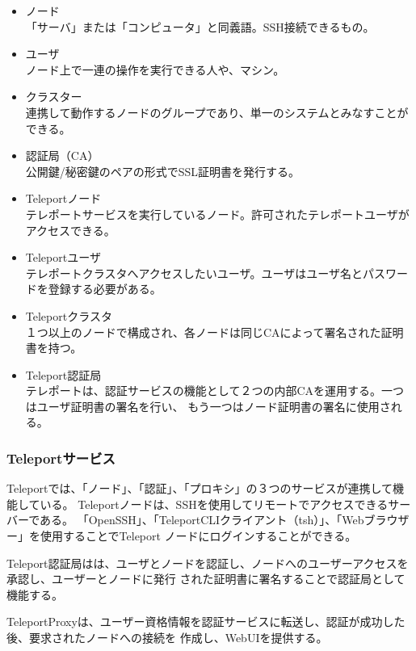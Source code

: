 \documentclass[11pt,a4j,titlepage]{jreport}
\begin{document}
\begin{itemize}
    \item ノード\mbox{}\\「サーバ」または「コンピュータ」と同義語。SSH接続できるもの。
    \item ユーザ\mbox{}\\ノード上で一連の操作を実行できる人や、マシン。
    \item クラスター\mbox{}\\連携して動作するノードのグループであり、単一のシステムとみなすことができる。
    \item 認証局（CA）\mbox{}\\公開鍵/秘密鍵のペアの形式でSSL証明書を発行する。
    \item Teleportノード\mbox{}\\テレポートサービスを実行しているノード。許可されたテレポートユーザがアクセスできる。
    \item Teleportユーザ\mbox{}\\テレポートクラスタへアクセスしたいユーザ。ユーザはユーザ名とパスワードを登録する必要がある。
    \item Teleportクラスタ\mbox{}\\１つ以上のノードで構成され、各ノードは同じCAによって署名された証明書を持つ。
    
    \item Teleport認証局\mbox{}\\テレポートは、認証サービスの機能として２つの内部CAを運用する。一つはユーザ証明書の署名を行い、
    もう一つはノード証明書の署名に使用される。

    
\end{itemize}

\subsubsection{Teleportサービス}
Teleportでは、「ノード」、「認証」、「プロキシ」の３つのサービスが連携して機能している。
Teleportノードは、SSHを使用してリモートでアクセスできるサーバーである。
「OpenSSH」、「TeleportCLIクライアント（tsh）」、「Webブラウザー」を使用することでTeleport
ノードにログインすることができる。

Teleport認証局はは、ユーザとノードを認証し、ノードへのユーザーアクセスを承認し、ユーザーとノードに発行
された証明書に署名することで認証局として機能する。\par
TeleportProxyは、ユーザー資格情報を認証サービスに転送し、認証が成功した後、要求されたノードへの接続を
作成し、WebUIを提供する。
\end{document}
